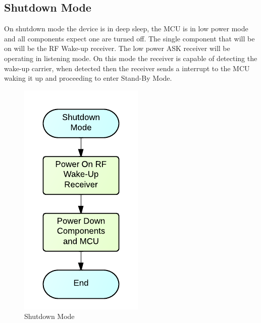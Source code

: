 \subsection{Shutdown Mode}
On shutdown mode the device is in deep sleep, the MCU is in low power mode and all components expect one are turned off. The single component that will be on will be the RF Wake-up receiver. The low power ASK receiver will be operating in listening mode. On this mode the receiver is capable of detecting the wake-up carrier, when detected then the receiver sends a interrupt to the MCU waking it up and proceeding to enter Stand-By Mode.
\begin{figure}[H]
	\centering
	\includegraphics[scale=1.0]{img/ShutdownMode}
	\caption{Shutdown Mode \label{fig:shutdownMode}}
\end{figure}

